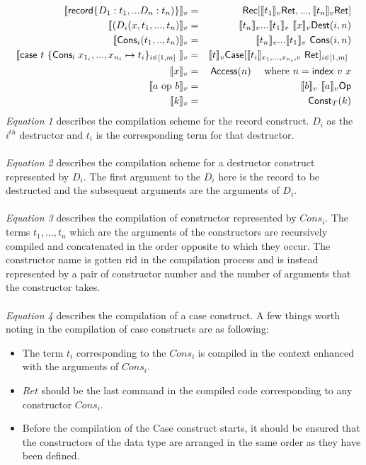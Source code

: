 \documentclass[11pt]{article}
\newcommand{\<}{\langle}
\renewcommand{\>}{\rangle}
\begin{document}
  \begin{eqnarray}
  \llbracket {\sf record} \{ D_1: t_1,...D_n:t_n)\} \rrbracket_v & = &
  {\sf Rec}[ \llbracket t_1 \rrbracket_v {\sf Ret}, ..., \llbracket t_n \rrbracket_v {\sf Ret} ]\\
  \llbracket (D_i(x,t_1,...,t_n) \rrbracket_v & = & \llbracket t_n \rrbracket_v ... \llbracket t_1 \rrbracket_v ~\llbracket x \rrbracket_v {\sf Dest}(i,n) \\
  \llbracket {\sf Cons}_i(t_1,..,t_n) \rrbracket_v & = & \llbracket t_n \rrbracket_v ... \llbracket t_1 \rrbracket_v ~ {\sf Cons}(i,n) \\
  \llbracket {\sf case} ~ t~ \{ {\sf Cons_i} ~x_{1_i},...,x_{n_i} \mapsto t_i \}_{i \in [1,m]~} \rrbracket_v & = & \llbracket t \rrbracket_v {\sf Case} [\llbracket t_i \rrbracket_{x_1,...,x_{n_i},v} ~{\sf Ret}]_{i \in [1,m]~} \\
  \llbracket x \rrbracket_v & = & {\sf Access}(n) ~~~~\mbox{where $n={\sf index}~v~x$} \\
   \llbracket a~{\rm op}~b \rrbracket_v & = & \llbracket b \rrbracket_v ~ \llbracket a \rrbracket_v {\sf Op} \\
    \llbracket k\rrbracket_v & = & {\sf Const}_T(k) 
  \end{eqnarray}
{\em Equation 1} describes the compilation scheme for the {\sf record} construct. $D_i$ as the $i^{th}$ destructor and $t_i$ is the corresponding term for that destructor.
~~\\~~\\
{\em Equation 2} describes the compilation scheme for a {\sf destructor} construct represented by $D_i$. The first argument to the $D_i$ here is the record to be destructed and the subsequent arguments are the arguments of $D_i$. 
~~\\~~\\ 
{\em Equation 3} describes the compilation of {\sf constructor} represented by $Cons_i$. The terms $t_1,\ldots,t_n$ which are the arguments of the constructors are recursively compiled and concatenated in the order opposite to which they occur. The constructor name is gotten rid in the compilation process and is instead represented by a pair of constructor number and the number of arguments that the constructor takes.
~~\\~~\\
{\em Equation 4} describes the compilation of a {\sf case} construct. A few things worth noting in the compilation of {\sf case} constructs are as following:
\begin {itemize}
\item The term $t_i$ corresponding to the $Cons_i$ is compiled in the context enhanced with the arguments of $Cons_i$.
\item $Ret$ should be the last command in the compiled code corresponding to any constructor $Cons_i$.
\item Before the compilation of the {\sf Case} construct starts, it should be ensured that the constructors of the data type are arranged in the same order as they have been defined.
\end{itemize}
\end{document}
